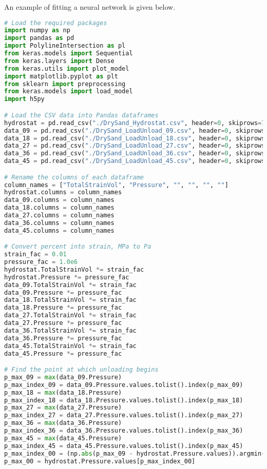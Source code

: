 An example of fitting a neural network is given below.
\begin{lstlisting}[language=Python]
# Load the required packages
import numpy as np
import pandas as pd
import PolylineIntersection as pl
from keras.models import Sequential
from keras.layers import Dense
from keras.utils import plot_model
import matplotlib.pyplot as plt
from sklearn import preprocessing
from keras.models import load_model
import h5py

# Load the CSV data into Pandas dataframes
hydrostat = pd.read_csv("./DrySand_Hydrostat.csv", header=0, skiprows=7)
data_09 = pd.read_csv("./DrySand_LoadUnload_09.csv", header=0, skiprows=4)
data_18 = pd.read_csv("./DrySand_LoadUnload_18.csv", header=0, skiprows=4)
data_27 = pd.read_csv("./DrySand_LoadUnload_27.csv", header=0, skiprows=4)
data_36 = pd.read_csv("./DrySand_LoadUnload_36.csv", header=0, skiprows=4)
data_45 = pd.read_csv("./DrySand_LoadUnload_45.csv", header=0, skiprows=4)

# Rename the columns of each dataframe
column_names = ["TotalStrainVol", "Pressure", "", "", "", ""]
hydrostat.columns = column_names
data_09.columns = column_names
data_18.columns = column_names
data_27.columns = column_names
data_36.columns = column_names
data_45.columns = column_names

# Convert percent into strain, MPa to Pa
strain_fac = 0.01
pressure_fac = 1.0e6
hydrostat.TotalStrainVol *= strain_fac
hydrostat.Pressure *= pressure_fac
data_09.TotalStrainVol *= strain_fac
data_09.Pressure *= pressure_fac
data_18.TotalStrainVol *= strain_fac
data_18.Pressure *= pressure_fac
data_27.TotalStrainVol *= strain_fac
data_27.Pressure *= pressure_fac
data_36.TotalStrainVol *= strain_fac
data_36.Pressure *= pressure_fac
data_45.TotalStrainVol *= strain_fac
data_45.Pressure *= pressure_fac

# Find the point at which unloading begins
p_max_09 = max(data_09.Pressure)
p_max_index_09 = data_09.Pressure.values.tolist().index(p_max_09)
p_max_18 = max(data_18.Pressure)
p_max_index_18 = data_18.Pressure.values.tolist().index(p_max_18)
p_max_27 = max(data_27.Pressure)
p_max_index_27 = data_27.Pressure.values.tolist().index(p_max_27)
p_max_36 = max(data_36.Pressure)
p_max_index_36 = data_36.Pressure.values.tolist().index(p_max_36)
p_max_45 = max(data_45.Pressure)
p_max_index_45 = data_45.Pressure.values.tolist().index(p_max_45)
p_max_index_00 = (np.abs(p_max_09 - hydrostat.Pressure.values)).argmin()
p_max_00 = hydrostat.Pressure.values[p_max_index_00]


\end{lstlisting}
